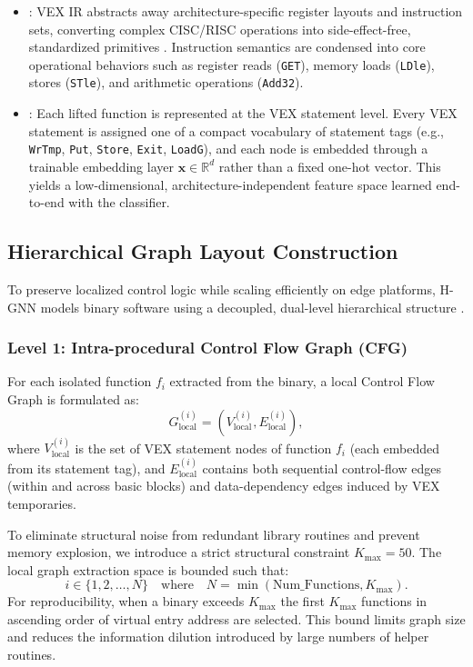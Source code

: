 \documentclass{llncs}
\begin{document}
\begin{itemize}
    \item {}: VEX IR abstracts away architecture-specific register layouts and instruction sets, converting complex CISC/RISC operations into side-effect-free, standardized primitives \cite{b8}. Instruction semantics are condensed into core operational behaviors such as register reads (\texttt{GET}), memory loads (\texttt{LDle}), stores (\texttt{STle}), and arithmetic operations (\texttt{Add32}).
    \item {}: Each lifted function is represented at the VEX
statement level. Every VEX statement is assigned one of a compact vocabulary of
statement tags (e.g., \texttt{WrTmp}, \texttt{Put}, \texttt{Store}, \texttt{Exit}, \texttt{LoadG}),
and each node is embedded through a trainable embedding layer $\mathbf{x} \in \mathbb{R}^{d}$
rather than a fixed one-hot vector. This yields a low-dimensional, architecture-independent
feature space learned end-to-end with the classifier.
\end{itemize}

\subsection{Hierarchical Graph Layout Construction}
To preserve localized control logic while scaling efficiently on edge platforms, H-GNN models binary software using a decoupled, dual-level hierarchical structure \cite{b6}.

\subsubsection{Level 1: Intra-procedural Control Flow Graph (CFG)}
For each isolated function $f_i$ extracted from the binary, a local Control Flow Graph is formulated as:
\begin{equation}
G_{\text{local}}^{(i)} = (V_{\text{local}}^{(i)}, E_{\text{local}}^{(i)}),
\end{equation}
where $V_{\text{local}}^{(i)}$ is the set of VEX statement nodes of function $f_i$
(each embedded from its statement tag), and $E_{\text{local}}^{(i)}$ contains both sequential
control-flow edges (within and across basic blocks) and data-dependency edges induced by VEX
temporaries.

To eliminate structural noise from redundant library routines and prevent memory explosion, we introduce a strict structural constraint $K_{\text{max}} = 50$. The local graph extraction space is bounded such that:
\begin{equation}
i \in \{1, 2, \dots, N\} \quad \text{where} \quad N = \min(\text{Num\_Functions}, K_{\text{max}}).
\end{equation}
For reproducibility, when a binary exceeds $K_{\text{max}}$ the first $K_{\text{max}}$ functions in ascending order of virtual entry address are selected. This bound limits graph size and reduces the information dilution introduced by large numbers of helper routines.
\end{document}
